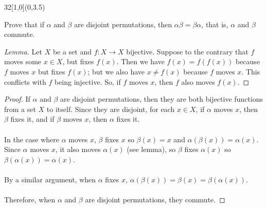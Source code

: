 \documentclass[12pt]{article}
\newenvironment{exercise}[2]{\begin{textblock}{32}[1,0](0,#2)\noindent#1\end{textblock}}{\vspace{1in}}
\begin{document}
\newpage

\begin{exercise}{1.8}{3.5}
	{\noindent}Prove that if $\alpha$ and $\beta$ are disjoint permutations, then $\alpha\beta=\beta\alpha$, that is, $\alpha$ and $\beta$ commute.
	\bigskip

	\begin{proof}[Lemma]
		Let $X$ be a set and $f:X\to X$ bijective. Suppose to the contrary that $f$ moves some $x\in X$, but fixes $f(x)$. Then we have $f(x) = f(f(x))$ because $f$ moves $x$ but fixes $f(x)$; but we also have $x\neq f(x)$ because $f$ moves $x$. This conflicts with $f$ being injective.
		So, if $f$ moves $x$, then $f$ also moves $f(x)$.
	\end{proof}
	\bigskip

	\begin{proof}
		If $\alpha$ and $\beta$ are disjoint permutations, then they are both bijective functions from a set $X$ to itself. Since they are disjoint, for each $x\in X$, if $\alpha$ moves $x$, then $\beta$ fixes it, and if $\beta$ moves $x$, then $\alpha$ fixes it.\\
		\\
		In the case where $\alpha$ moves $x$, $\beta$ fixes $x$ so $\beta(x) = x$ and $\alpha(\beta(x)) = \alpha(x)$.\\
		Since $\alpha$ moves $x$, it also moves $\alpha(x)$ (see lemma), so $\beta$ fixes $\alpha(x)$ so $\beta(\alpha(x)) = \alpha(x)$.\\
		\\
		By a similar argument, when $\alpha$ fixes $x$, $\alpha(\beta(x)) = \beta(x) = \beta(\alpha(x))$.\\
		\\
		Therefore, when $\alpha$ and $\beta$ are disjoint permutations, they commute.
	\end{proof}
\end{exercise}

\newpage
\end{document}

